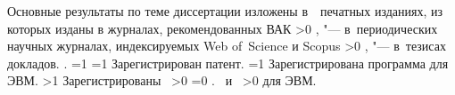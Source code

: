 {\begin{refsection}
        \nocite{*}%
        {\publications} Основные результаты по теме диссертации изложены в~~печатных изданиях,
         из которых изданы в журналах, рекомендованных ВАК\sloppy%
        \ifnum \value{citeauthorscopuswos}>0%
            ,  "--- в~периодических научных журналах, индексируемых Web of~Science и Scopus\sloppy%
        \fi%
        \ifnum \value{citeauthorconf}>0%
            ,  "--- в~тезисах докладов.
        \else%
            .
        \fi%
        \ifnum \value{citeregistered}=1%
            \ifnum \value{citeauthorpatent}=1%
                Зарегистрирован  патент.
            \fi%
            \ifnum \value{citeauthorprogram}=1%
                Зарегистрирована  программа для ЭВМ.
            \fi%
        \fi%
        \ifnum \value{citeregistered}>1%
            Зарегистрированы\ %
            \ifnum \value{citeauthorpatent}>0%
            \sloppy%
            \ifnum \value{citeauthorprogram}=0 . \else \ и~\fi%
            \fi%
            \ifnum \value{citeauthorprogram}>0%
             для ЭВМ.
            \fi%
        \fi%
    \end{refsection}%
    \begin{refsection}
        \nocite{vakbib2}%
        \nocite{patbib1}%
        \nocite{progbib1}%
        \nocite{bib1}%
        \nocite{confbib1}%
    \end{refsection}%
}
